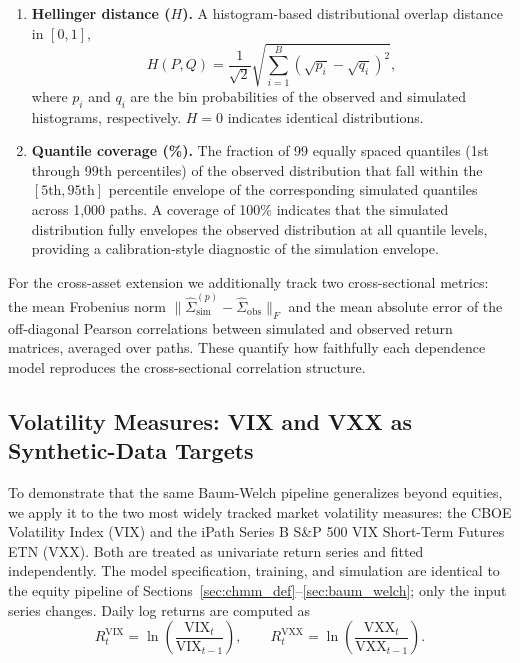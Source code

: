 \begin{enumerate}
    \item \textbf{Hellinger distance ($H$).}
    A histogram-based distributional overlap distance in $[0,1]$,
    \begin{equation}
        H(P, Q) = \frac{1}{\sqrt{2}} \sqrt{\sum_{i=1}^{B} \left(\sqrt{p_i} - \sqrt{q_i}\right)^2},
        \label{eq:hellinger}
    \end{equation}
    where $p_i$ and $q_i$ are the bin probabilities of the observed and simulated histograms, respectively.
    $H = 0$ indicates identical distributions.

    \item \textbf{Quantile coverage (\%).}
    The fraction of 99 equally spaced quantiles (1st through 99th percentiles) of the observed distribution that fall within the $[5\text{th}, 95\text{th}]$ percentile envelope of the corresponding simulated quantiles across 1{,}000 paths.
    A coverage of 100\% indicates that the simulated distribution fully envelopes the observed distribution at all quantile levels, providing a calibration-style diagnostic of the simulation envelope.
\end{enumerate}

For the cross-asset extension we additionally track two cross-sectional metrics: the mean Frobenius norm $\|\hat{\Sigma}_{\text{sim}}^{(p)} - \hat{\Sigma}_{\text{obs}}\|_F$ and the mean absolute error of the off-diagonal Pearson correlations between simulated and observed return matrices, averaged over paths.
These quantify how faithfully each dependence model reproduces the cross-sectional correlation structure.

\subsection{Volatility Measures: VIX and VXX as Synthetic-Data Targets}
\label{sec:vix_methods}

To demonstrate that the same Baum-Welch pipeline generalizes beyond equities, we apply it to the two most widely tracked market volatility measures: the CBOE Volatility Index (VIX) and the iPath Series B S\&P 500 VIX Short-Term Futures ETN (VXX).
Both are treated as univariate return series and fitted independently.
The model specification, training, and simulation are identical to the equity pipeline of Sections~\ref{sec:chmm_def}--\ref{sec:baum_welch}; only the input series changes.
Daily log returns are computed as
\begin{equation}
    R_t^{\text{VIX}} = \ln\!\left(\frac{\text{VIX}_t}{\text{VIX}_{t-1}}\right),
    \qquad
    R_t^{\text{VXX}} = \ln\!\left(\frac{\text{VXX}_t}{\text{VXX}_{t-1}}\right).
    \label{eq:vix_returns}
\end{equation}

